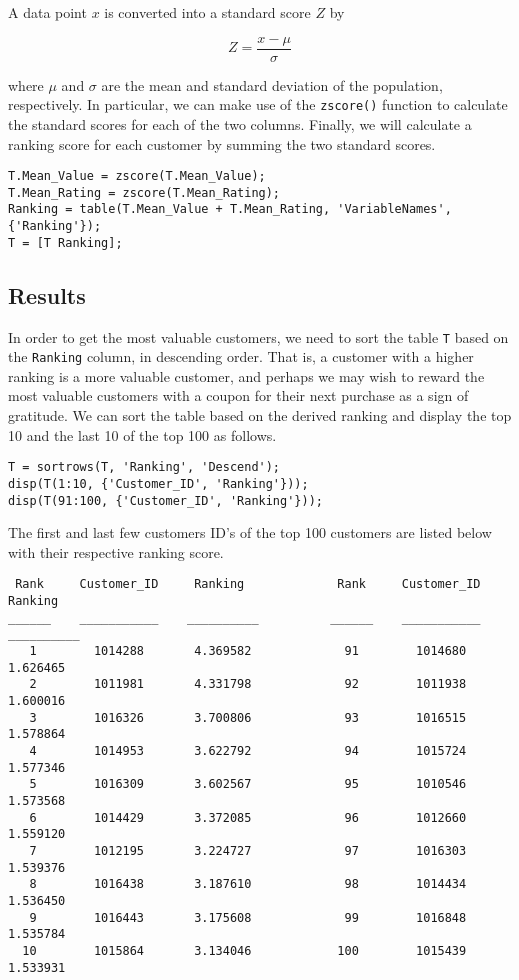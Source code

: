 \noindent
A data point $x$ is converted into a standard score $Z$ by

$$Z = \frac{x - \mu}{\sigma}$$

\noindent
where $\mu$ and $\sigma$ are the mean and standard deviation of the population, respectively. In particular, we can make use of the \lstinline|zscore()| function to calculate the standard scores for each of the two columns. Finally, we will calculate a ranking score for each customer by summing the two standard scores.

\begin{lstlisting}
T.Mean_Value = zscore(T.Mean_Value);
T.Mean_Rating = zscore(T.Mean_Rating);
Ranking = table(T.Mean_Value + T.Mean_Rating, 'VariableNames', {'Ranking'});
T = [T Ranking];
\end{lstlisting}

\subsection{Results}

In order to get the most valuable customers, we need to sort the table \lstinline|T| based on the \lstinline|Ranking| column, in descending order. That is, a customer with a higher ranking is a more valuable customer, and perhaps we may wish to reward the most valuable customers with a coupon for their next purchase as a sign of gratitude. We can sort the table based on the derived ranking and display the top 10 and the last 10 of the top 100 as follows.

\begin{lstlisting}
T = sortrows(T, 'Ranking', 'Descend');
disp(T(1:10, {'Customer_ID', 'Ranking'}));
disp(T(91:100, {'Customer_ID', 'Ranking'}));
\end{lstlisting}

\newpage
\noindent
The first and last few customers ID's of the top 100 customers are listed below with their respective ranking score.

\begin{lstlisting}
 Rank     Customer_ID     Ranking             Rank     Customer_ID     Ranking  
______    ___________    __________          ______    ___________    __________
   1        1014288       4.369582             91        1014680       1.626465
   2        1011981       4.331798             92        1011938       1.600016
   3        1016326       3.700806             93        1016515       1.578864
   4        1014953       3.622792             94        1015724       1.577346
   5        1016309       3.602567             95        1010546       1.573568
   6        1014429       3.372085             96        1012660       1.559120
   7        1012195       3.224727             97        1016303       1.539376
   8        1016438       3.187610             98        1014434       1.536450
   9        1016443       3.175608             99        1016848       1.535784
  10        1015864       3.134046            100        1015439       1.533931   
\end{lstlisting}
